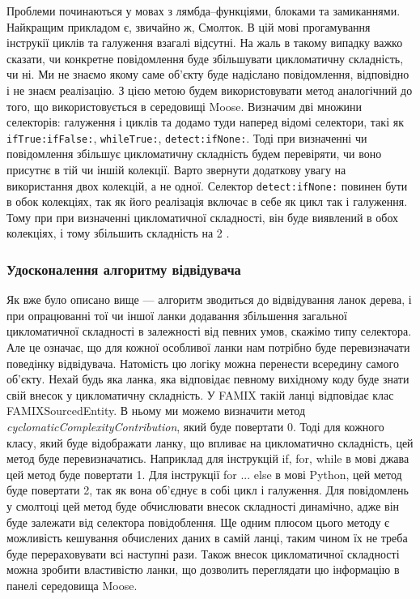 \documentclass[12pt,a4paper]{article}
\begin{document}
Проблеми починаються у мовах з лямбда--функціями, блоками та замиканнями. Найкращим прикладом є, звичайно ж, Смолток. В цій мові прогамування інструкії циклів та галуження взагалі відсутні. На жаль в такому випадку важко сказати, чи конкретне повідомлення буде збільшувати цикломатичну складність, чи ні. Ми не знаємо якому саме об'єкту буде надіслано повідомлення, відповідно і не знаєм реалізацію. З цією метою будем використовувати метод аналогічний до того, що використовується в середовищі Moose. Визначим дві множини селекторів: галуження і циклів та додамо туди наперед відомі селектори, такі як \lstinline$ifTrue:ifFalse:$, \lstinline$whileTrue:$, \lstinline$detect:ifNone:$. Тоді при визначенні чи повідомлення збільшує цикломатичну складність будем перевіряти, чи воно присутнє в тій чи іншій колекції. Варто звернути додаткову увагу на використання двох колекцій, а не одної. Селектор \lstinline$detect:ifNone:$ повинен бути в обок колекціях, так як його реалізація включає в себе як цикл так і галуження. Тому при при визначенні цикломатичної складності, він буде виявлений в обох колекціях, і тому збільшить складність на 2 \cite{cyclocomplexity-moose}.

\subsubsection{Удосконалення алгоритму відвідувача}
Як вже було описано вище --- алгоритм зводиться до відвідування ланок дерева, і при опрацюванні тої чи іншої ланки додавання збільшення загальної цикломатичної складності в залежності від певних умов, скажімо типу селектора. Але це означає, що для кожної особливої ланки нам потрібно буде перевизначати поведінку відвідувача. Натомість цю логіку можна перенести всередину самого об'єкту. Нехай будь яка ланка, яка відповідає певному вихідному коду буде знати свій внесок у цикломатичну складність. У FAMIX такій ланці відповідає клас FAMIXSourcedEntity. В ньому ми можемо визначити метод \emph{cyclomaticComplexityContribution}, який буде повертати 0. Тоді для кожного класу, який буде відображати ланку, що впливає на цикломатично складність, цей метод буде перевизначатись. Наприклад для інструкцій if, for, while в мові джава цей метод буде повертати 1. Для інструкції for ... else в мові Python, цей метод буде повертати 2, так як вона об'єднує в собі цикл і галуження. Для повідомлень у смолтоці цей метод буде обчислювати внесок складності динамічно, адже він буде залежати від селектора повідоблення. Ще одним плюсом цього методу є можливість кешування обчислених даних в самій ланці, таким чином їх не треба буде перераховувати всі наступні рази. Також внесок цикломатичної складності можна зробити властивістю ланки, що дозволить переглядати цю інформацію в панелі середовища Moose.
\end{document}
